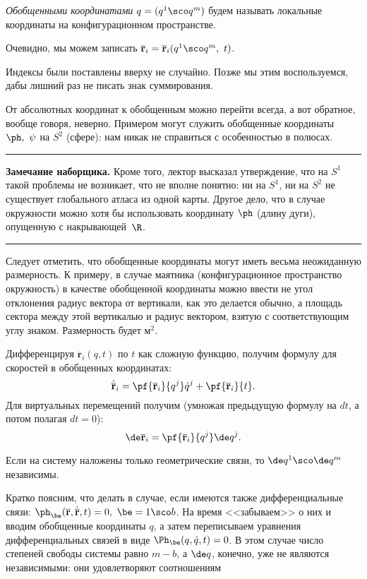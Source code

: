 \documentclass[a4paper,12pt]{article}
\newcommand{\vb}[1]{\mathbf{\overline{#1}}}
\newcommand{\vd}[1]{\dot{\mathbf{\overline{#1}}}}
\newcommand{\tdf}[1]{\textsl{#1}}
\newenvironment{nbb}{\par\vskip3pt\hrule\vskip3pt\textbf{\footnotesize Замечание наборщика.}\footnotesize }
{\vskip3pt\hrule\par\vskip3pt}
\newcommand{\eql}[2]{\begin{equation}\label{#2}#1\end{equation}}
\begin{document}
\begin{df}
\tdf{Обобщенными координатами} $q=(q^1\sco q^m)$ будем называть
локальные координаты на конфигурационном пространстве.
\end{df}

Очевидно, мы можем записать $\vb{r}_i=\vb{r}_i(q^1\sco q^m,\ t)$.
\begin{note}
Индексы были поставлены вверху не случайно. Позже мы этим
воспользуемся, дабы лишний раз не писать знак суммирования.
\end{note}
\begin{note}
От абсолютных координат к обобщенным можно перейти всегда, а вот
обратное, вообще говоря, неверно. Примером могут служить обобщенные
координаты $\ph,\ \psi$ на $S^2$ (сфере): нам никак не справиться с
особенностью в полюсах.
\end{note}

\begin{nbb}
Кроме того, лектор высказал утверждение, что на $S^1$ такой
проблемы не возникает, что не вполне понятно: ни на $S^1$, ни на $S^2$
не существует глобального атласа из одной карты. Другое дело, что в случае окружности
можно хотя бы использовать координату $\ph$ (длину дуги), опущенную с накрывающей~$\R$.
\end{nbb}

\begin{note}
Следует отметить, что обобщенные координаты могут иметь весьма
неожиданную размерность. К примеру, в случае маятника
(конфигурационное пространство окружность) в качестве обобщенной
координаты можно ввести не угол отклонения радиус вектора от
вертикали, как это делается обычно, а площадь сектора между этой
вертикалью и радиус вектором, взятую с соответствующим углу знаком.
Размерность будет $м^2$.
\end{note}

Дифференцируя $\vb{r}_i(q,t)$ по $t$ как сложную функцию, получим
формулу для скоростей в обобщенных координатах:
\eql{\vd{r}_i=\pf{\vb{r}_i}{q^j}\dot{q}^j+\pf{\vb{r}_i}{t}.}{speed_gen}
Для виртуальных перемещений получим (умножая предыдущую формулу на
$dt$, а потом полагая $dt=0$):
\eql{\de\vb{r}_i=\pf{\vb{r}_i}{q^j}\de q^j.}{virt_gen}

\begin{note}
Если на систему наложены только геометрические связи, то $\de
q^1\sco\de q^m$ независимы.
\end{note}

\begin{note}
Кратко поясним, что делать в случае, если имеются также
дифференциальные связи: $\ph_{\be}(\vb{r},\vd{r},t)=0,\ \be=1\sco
b$. На время <<забываем>> о них и вводим обобщенные координаты $q$,
а затем переписываем уравнения дифференциальных связей в виде
$\Ph_{\be}(q,\dot{q},t)=0$. В этом случае число степеней свободы
системы равно $m-b$, а $\de q$, конечно, уже не являются
независимыми: они удовлетворяют соотношениям
\end{note}
\end{document}
